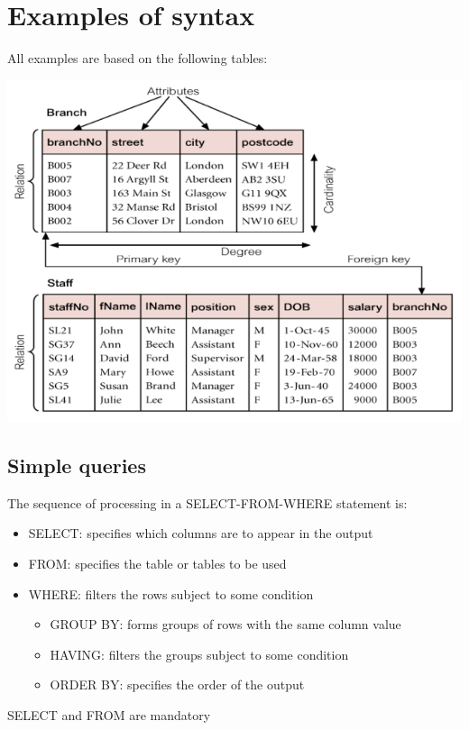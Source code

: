 \documentclass{article}[18pt]
\begin{document}
\section{Examples of syntax}
All examples are based on the following tables:
\begin{center}
	\includegraphics[scale=0.7]{example}
\end{center}
\subsection{Simple queries}
The sequence of processing in a SELECT-FROM-WHERE statement is:
\begin{itemize}
	\item SELECT: specifies which columns are to appear in the output
	\item FROM: specifies the table or tables to be used
	\item WHERE: filters the rows subject to some condition
	\begin{itemize}
		\item GROUP BY: forms groups of rows with the same column value
		\item HAVING: filters the groups subject to some condition
		\item ORDER BY: specifies the order of the output
	\end{itemize}
\end{itemize}
\begin{center}
	{\Large SELECT and FROM are mandatory}
\end{center}
\end{document}
